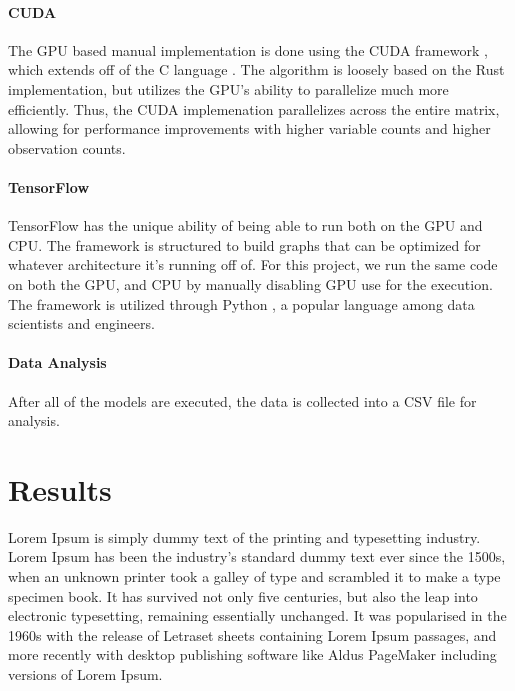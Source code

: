 \documentclass[12pt]{article}
\newcommand{\CC}{C\nolinebreak\hspace{-.05em}\raisebox{.4ex}{\tiny\bf +}\nolinebreak\hspace{-.10em}\raisebox{.4ex}{\tiny\bf +} }
\begin{document}
\paragraph{CUDA}
The GPU based manual implementation is done using the CUDA framework \cite{lib_cuda}, which extends off of the \CC language \cite{lang_c++}.
The algorithm is loosely based on the Rust implementation, but utilizes the GPU's ability to parallelize much more efficiently.
Thus, the CUDA implemenation parallelizes across the entire matrix, allowing for performance improvements with higher variable counts and higher observation counts.

\paragraph{TensorFlow}
TensorFlow \cite{lib_tensorflow} has the unique ability of being able to run both on the GPU and CPU.
The framework is structured to build graphs that can be optimized for whatever architecture it's running off of.
For this project, we run the same code on both the GPU, and CPU by manually disabling GPU use for the execution.
The framework is utilized through Python \cite{lang_python}, a popular language among data scientists and engineers.

\paragraph{Data Analysis}
After all of the models are executed, the data is collected into a CSV file for analysis.

\section{Results}

Lorem Ipsum is simply dummy text of the printing and typesetting industry. Lorem Ipsum has been the industry's standard dummy text ever since the 1500s, when an unknown printer took a galley of type and scrambled it to make a type specimen book. It has survived not only five centuries, but also the leap into electronic typesetting, remaining essentially unchanged. It was popularised in the 1960s with the release of Letraset sheets containing Lorem Ipsum passages, and more recently with desktop publishing software like Aldus PageMaker including versions of Lorem Ipsum.
\end{document}
